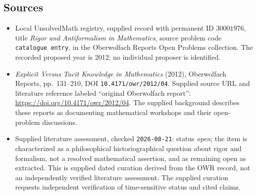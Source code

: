 \documentclass[11pt]{article}
\begin{document}
\subsection{Sources}
\begin{itemize}
\item Local UnsolvedMath registry, supplied record with permanent ID \(30001976\), title \emph{Rigor and Antiformalism in Mathematics}, source problem code \texttt{catalogue entry}, in the Oberwolfach Reports Open Problems collection. The recorded proposed year is 2012; no individual proposer is identified.
\item \emph{Explicit Versus Tacit Knowledge in Mathematics} (2012), Oberwolfach Reports, pp.~131--210, DOI \texttt{10.4171/owr/2012/04}. Supplied source URL and literature reference labeled ``original Oberwolfach report'': \url{https://doi.org/10.4171/owr/2012/04}. The supplied background describes these reports as documenting mathematical workshops and their open-problem discussions.
\item Supplied literature assessment, checked \texttt{2026-08-21}: status \emph{open}; the item is characterized as a philosophical historiographical question about rigor and formalism, not a resolved mathematical assertion, and as remaining open as extracted. This is supplied dated curation derived from the OWR record, not an independently verified literature assessment. The supplied curation requests independent verification of time-sensitive status and cited claims.
\end{itemize}
\end{document}
